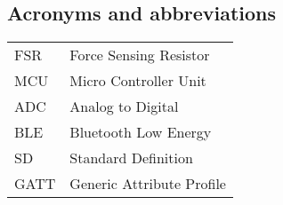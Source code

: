 \subsection*{Acronyms and abbreviations}

\begingroup
\renewcommand{\arraystretch}{1.2}
\begin{tabular}{@{}p{2.5cm} l}
    FSR     & Force Sensing Resistor\\
    MCU     & Micro Controller Unit\\
    ADC     & Analog to Digital\\
    BLE     & Bluetooth Low Energy\\
    SD     & Standard Definition\\
    GATT     & Generic Attribute Profile\\

\end{tabular}
\endgroup
